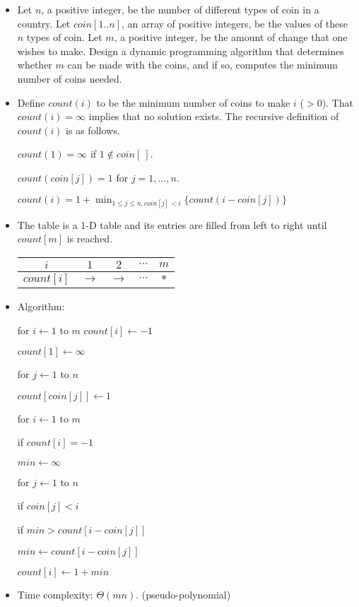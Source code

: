 \documentclass{article}
\begin{document}
\begin{itemize}

\item Let $n$, a positive integer, be the number of different
types of coin in a country. Let $coin[1..n]$, an array of
positive integers, be the values of these $n$ types of coin. Let
$m$, a positive integer, be the amount of change that one wishes to make.
Design a dynamic programming algorithm that determines whether $m$
can be made with the coins, and if so, computes the minimum number of coins
needed.

\item Define $count(i)$ to be the minimum number of coins to
make $i$ ($>0$). That $count(i)=\infty$ implies that no solution
exists. The recursive definition of $count(i)$ is as follows.

$count(1)=\infty$ if $1\not\in coin[\ ]$.

$count(coin[j])=1$ for $j=1,\ldots,n$.

$count(i)=1+\min_{1\le j\le n,coin[j]<i}\{count(i-coin[j])\}$

\item The table is a 1-D table and its entries are filled from left
to right until $count[m]$ is reached.

\begin{center}
\begin{tabular}{c|c|c|c|c}
$i$ & $1$ & $2$ & $\cdots$ & $m$\\\hline
$count[i]$ & $\rightarrow$ & $\rightarrow$ & $\cdots$ & $*$\\
\end{tabular}
\end{center}

\item Algorithm:

\qquad for $i\leftarrow 1$ to $m$ $count[i]\leftarrow -1$

\qquad $count[1]\leftarrow\infty$

\qquad for $j\leftarrow 1$ to $n$

\qquad\qquad $count[coin[j]]\leftarrow 1$

\qquad for $i\leftarrow 1$ to $m$

\qquad\qquad if $count[i]=-1$

\qquad\qquad\qquad $min\leftarrow\infty$

\qquad\qquad\qquad for $j\leftarrow 1$ to $n$

\qquad\qquad\qquad\qquad if $coin[j]<i$ 
              
\qquad\qquad\qquad\qquad\qquad if $min>count[i-coin[j]]$

\qquad\qquad\qquad\qquad\qquad\qquad $min\leftarrow count[i-coin[j]]$

\qquad\qquad\qquad $count[i]\leftarrow 1+min$
 
\item Time complexity: $\Theta(mn)$. (pseudo-polynomial)

\end{itemize}
\end{document}
